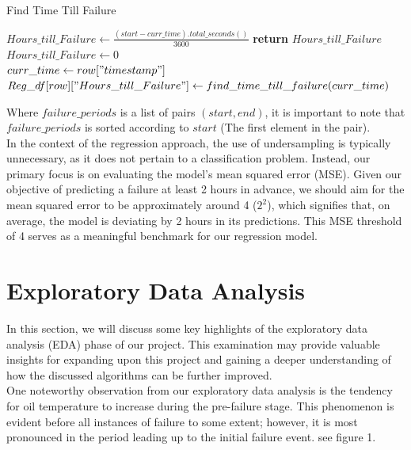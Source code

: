 \documentclass{article}
\begin{document}
\begin{algorithm}
\caption{Find Time Till Failure}
\begin{algorithmic}
        \State $Hours\_till\_Failure \gets \frac{(start - curr\_time).total\_seconds()}{3600}$
        \State \textbf{return} $Hours\_till\_Failure$
    \EndIf
\EndFor
\State $Hours\_till\_Failure \gets 0$ \\
    \State $curr\_time \gets row["timestamp"]$
    \State $Reg\_df[row]["Hours\_till\_Failure"] \gets find\_time\_till\_failure(curr\_time)$
\EndFor
\end{algorithmic}
\end{algorithm}

Where $failure\_periods$ is a list of pairs $(start, end)$, it is important to note that $failure\_periods$ is sorted according to $start$ (The first element in the pair). \\

In the context of the regression approach, the use of undersampling is typically unnecessary, as it does not pertain to a classification problem. Instead, our primary focus is on evaluating the model's mean squared error (MSE). Given our objective of predicting a failure at least 2 hours in advance, we should aim for the mean squared error to be approximately around 4 ($2^2$), which signifies that, on average, the model is deviating by 2 hours in its predictions. This MSE threshold of 4 serves as a meaningful benchmark for our regression model.

\newpage

\section{Exploratory Data Analysis}

In this section, we will discuss some key highlights of the exploratory data analysis (EDA) phase of our project. This examination may provide valuable insights for expanding upon this project and gaining a deeper understanding of how the discussed algorithms can be further improved.\\

One noteworthy observation from our exploratory data analysis is the tendency for oil temperature to increase during the pre-failure stage. This phenomenon is evident before all instances of failure to some extent; however, it is most pronounced in the period leading up to the initial failure event. see figure 1.\\
\end{document}
